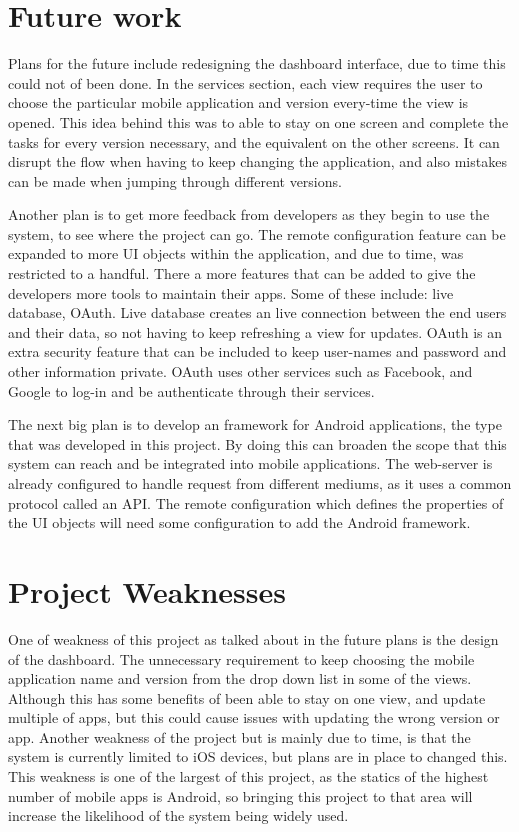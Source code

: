 \section{Future work}

Plans for the future include redesigning the dashboard interface, due to time this could not of been done. In the services section, each view requires the user to choose the particular mobile application and version every-time the view is opened. This idea behind this was to able to stay on one screen and complete the tasks for every version necessary, and the equivalent on the other screens. It can disrupt the flow when having to keep changing the application, and also mistakes can be made when jumping through different versions.

Another plan is to get more feedback from developers as they begin to use the system, to see where the project can go. The remote configuration feature can be expanded to more UI objects within the application, and due to time, was restricted to a handful. There a more features that can be added to give the developers more tools to maintain their apps. Some of these include: live database, OAuth. Live database creates an live connection between the end users and their data, so not having to keep refreshing a view for updates. OAuth is an extra security feature that can be included to keep user-names and password and other information private. OAuth uses other services such as Facebook, and Google to log-in and be authenticate through their services. 

The next big plan is to develop an framework for Android applications, the type that was developed in this project. By doing this can broaden the scope that this system can reach and be integrated into mobile applications. The web-server is already configured to handle request from different mediums, as it uses a common protocol called an API. The remote configuration which defines the properties of the UI objects will need some configuration to add the Android framework.

\section{Project Weaknesses}

One of weakness of this project as talked about in the future plans is the design of the dashboard. The unnecessary requirement to keep choosing the mobile application name and version from the drop down list in some of the views. Although this has some benefits of been able to stay on one view, and update multiple of apps, but this could cause issues with updating the wrong version or app. Another weakness of the project but is mainly due to time, is that the system is currently limited to iOS devices, but plans are in place to changed this. This weakness is one of the largest of this project, as the statics of the highest number of mobile apps is Android, so bringing this project to that area will increase the likelihood of the system being widely used. 

